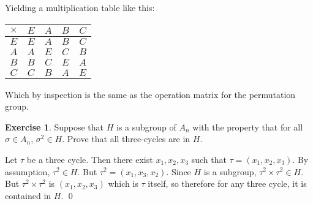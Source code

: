 \documentclass[11pt,oneside]{article}
\numberwithin{equation}{section}
\theoremstyle{definition}
\newtheorem{exercise}{Exercise}
\begin{document}
\begin{solution}
Yielding a multiplication table like this:

  \begin{center}
    \begin{tabular}{ |c|c|c|c|c| }
      \hline
          {$\times$} & $E$ & $A$ & $B$ & $C$ \\
          \hline
          $E$      & $E$ & $A$ & $B$ & $C$ \\
          $A$      & $A$ & $E$ & $C$ & $B$ \\
          $B$      & $B$ & $C$ & $E$ & $A$ \\
          $C$      & $C$ & $B$ & $A$ & $E$ \\
          \hline
    \end{tabular}
  \end{center}

  Which by inspection is the same as the operation matrix for the
  permutation group.
\end{solution}
\begin{exercise}
  Suppose that $H$ is a subgroup of $A _n $ with the property that for
  all $\sigma \in A_n$, $\sigma ^ 2 \in H$.  Prove that all three-cycles
  are in $H$.
\end{exercise}
\begin{solution}
  Let $\tau$ be a three cycle.  Then there exist $x_1, x_2, x_3 $ such
  that $\tau = ( x_1, x_2, x_3)$.  By assumption, $\tau ^2 \in H$.
  But $\tau ^2 = (x_1, x_3, x_2)$. Since $H$ is a subgroup,
  $\tau ^2 \times \tau ^2 \in H$.  But $\tau ^2 \times \tau ^2$
  is $ (x_1, x_2, x_3)$ which is $\tau$ itself, so
  therefore for any three cycle, it is contained in $H$.
  \qed
  

\end{solution}
\end{document}
